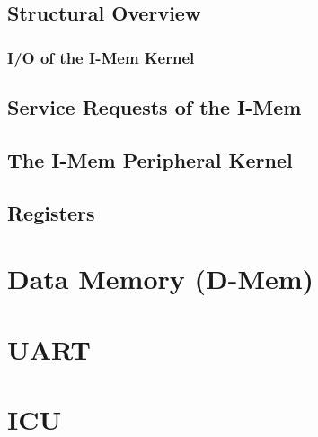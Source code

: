 \subsection{Structural Overview}

%
%
\subsubsection{I/O of the I-Mem Kernel}

%
%
%
\subsection{Service Requests of the I-Mem}

\subsection{The I-Mem Peripheral Kernel}
\label{subsec:imemfunc02}

%
\subsection{Registers}


\section{Data Memory (D-Mem)}
\label{sec:dmemfunc01}


\section{UART}


\section{ICU}




